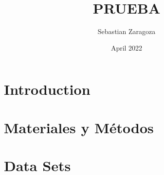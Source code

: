 \documentclass{article}
\title{PRUEBA}
\author{Sebastian Zaragoza}
\date{April 2022}
\begin{document}

\maketitle

\section{Introduction}
\lipsum[2-4] %




\section{Materiales y Métodos}
\lipsum[5] %
\section{Data Sets}
\end{document}
